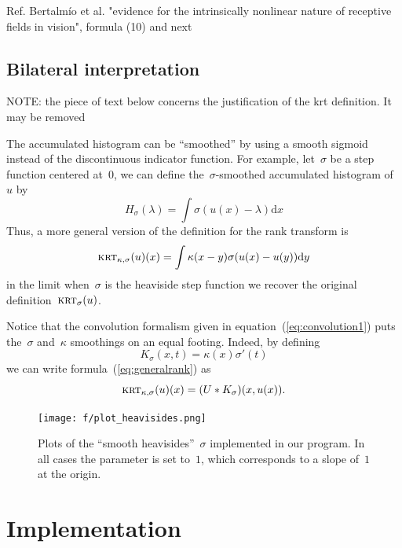 \documentclass[12pt]{article}                  %
\begin{document}
Ref. Bertalmío et al. "evidence for the intrinsically nonlinear nature of
receptive fields in vision", formula (10) and next~\cite{bertalmio2020evidence}


\subsection{Bilateral interpretation}

NOTE: the piece of text below concerns the justification of the krt
definition.  It may be removed 

The accumulated histogram can be ``smoothed'' by using a smooth sigmoid instead
of the discontinuous indicator function.  For example, let~$\sigma$ be a step
function centered at~$0$, we can define the~$\sigma$-smoothed accumulated
histogram of~$u$ by
\[
H_\sigma(\lambda)=\int\sigma(u(x)-\lambda)\mathrm{d}x
\]
Thus, a more general version of the definition for the rank transform is
\begin{equation}\label{eq:generalrank}
	\textsc{krt}_{\kappa,\sigma}(u)(x)=\int \kappa(x-y)\sigma(u(x)-u(y))\mathrm{d}y
\end{equation}
in the limit when~$\sigma$ is the heaviside step function we recover the
original definition~$\textsc{krt}_\sigma(u)$.

Notice that the convolution formalism given in
equation~(\ref{eq:convolution1}) puts the~$\sigma$ and~$\kappa$ smoothings
on an equal footing.  Indeed, by defining
\[
	K_\sigma(x,t)=\kappa(x)\sigma'(t)
\]
we can write formula~(\ref{eq:generalrank}) as
\begin{equation}\label{eq:convolution2}
	\textsc{krt}_{\kappa,\sigma}(u)(x)=(U*K_\sigma)(x,u(x)).
\end{equation}


\begin{figure}
	\centering
	\texttt{[image: f/plot\_heavisides.png]}
	\caption{Plots of the ``smooth heavisides''~$\sigma$ implemented in
	our program.  In all cases the parameter is set to~$1$, which
	corresponds to a slope of~$1$ at the origin.}
	\label{fig:heavisides}
\end{figure}



\section{Implementation}
\end{document}
